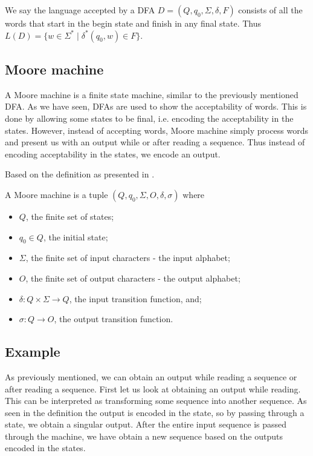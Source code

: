 \begin{definition}
We say the language accepted by a DFA $D=(Q,q_0,\Sigma,\delta,F)$ consists of all the words that start in the begin state and finish in any final state. Thus $L(D)=\{w\in\Sigma^*\mid \delta^*(q_0,w)\in F\}$.
\label{d:accepted_language}
\end{definition}


\subsection*{Moore machine}
A Moore machine is a finite state machine, similar to the previously mentioned DFA. As we have seen, DFAs are used to show the acceptability of words. This is done by allowing some states to be final, i.e. encoding the acceptability in the states. However, instead of accepting words, Moore machine simply process words and present us with an output while or after reading a sequence. Thus instead of encoding acceptability in the states, we encode an output. 

Based on the definition as presented in \cite{p:moore}.
\begin{definition}
	A Moore machine is a tuple $(Q,q_0,\Sigma,O,\delta,\sigma)$ where
	\begin{itemize}
		\item $Q$, the finite set of states;
		\item $q_0\in Q$, the initial state;
		\item $\Sigma$, the finite set of input characters - the input alphabet;
		\item $O$, the finite set of output characters - the output alphabet;
		\item $\delta: Q\times \Sigma\to Q$, the input transition function, and;
		\item $\sigma : Q\to O$, the output transition function.
	\end{itemize}
\end{definition}

\subsection*{Example}
As previously mentioned, we can obtain an output while reading a sequence or after reading a sequence. First let us look at obtaining an output while reading. This can be interpreted as transforming some sequence into another sequence. As seen in the definition the output is encoded in the state, so by passing through a state, we obtain a singular output. After the entire input sequence is passed through the machine, we have obtain a new sequence based on the outputs encoded in the states.

